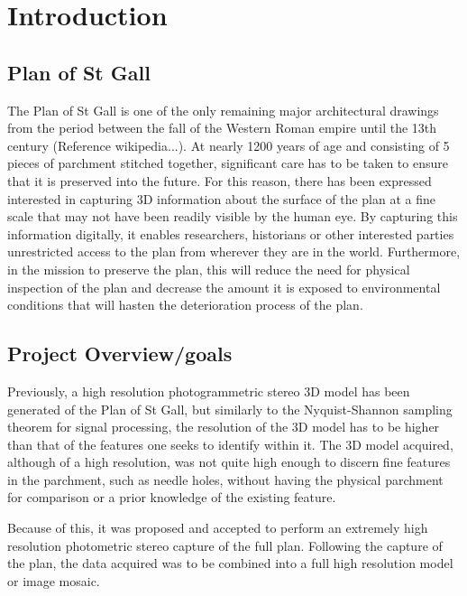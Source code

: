 
\chapter{Introduction}
\label{chp:IntroductionChapter}


\section{Plan of St Gall}
The Plan of St Gall is one of the only remaining major architectural drawings from the period between the fall of the Western Roman empire until the 13th century (Reference wikipedia...). At nearly 1200 years of age and consisting of 5 pieces of parchment stitched together, significant care has to be taken to ensure that it is preserved into the future. For this reason, there has been expressed interested in capturing 3D information about the surface of the plan at a fine scale that may not have been readily visible by the human eye. By capturing this information digitally, it enables researchers, historians or other interested parties unrestricted access to the plan from wherever they are in the world. Furthermore, in the mission to preserve the plan, this will reduce the need for physical inspection of the plan and decrease the amount it is exposed to environmental conditions that will hasten the deterioration process of the plan.

\section{Project Overview/goals}
Previously, a high resolution photogrammetric stereo 3D model has been generated of the Plan of St Gall, but similarly to the Nyquist-Shannon sampling theorem for signal processing, the resolution of the 3D model has to be higher than that of the features one seeks to identify within it. The 3D model acquired, although of a high resolution, was not quite high enough to discern fine features in the parchment, such as needle holes, without having the physical parchment for comparison or a prior knowledge of the existing feature. 

Because of this, it was proposed and accepted to perform an extremely high resolution photometric stereo capture of the full plan. Following the capture of the plan, the data acquired was to be combined into a full high resolution model or image mosaic.

